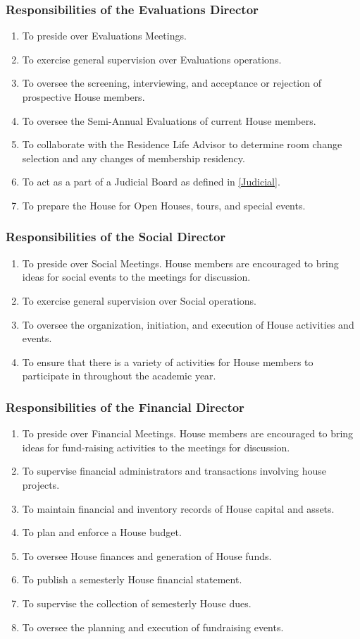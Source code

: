\documentclass{article}
\newcommand{\asubsection}[1]{\subsubsection{#1} \label{#1}}
\begin{document}
\asubsection{Responsibilities of the Evaluations Director}
\begin{enumerate}
	\item To preside over Evaluations Meetings.
	\item To exercise general supervision over Evaluations operations.
	\item To oversee the screening, interviewing, and acceptance or rejection of prospective House members.
	\item To oversee the Semi-Annual Evaluations of current House members.
	\item To collaborate with the Residence Life Advisor to determine room change selection and any changes of membership residency.
	\item To act as a part of a Judicial Board as defined in \ref{Judicial}.
	\item To prepare the House for Open Houses, tours, and special events.
\end{enumerate}

\asubsection{Responsibilities of the Social Director}
\begin{enumerate}
	\item To preside over Social Meetings. House members are encouraged to bring ideas for social events to the meetings for discussion.
	\item To exercise general supervision over Social operations.
	\item To oversee the organization, initiation, and execution of House activities and events.
	\item To ensure that there is a variety of activities for House members to participate in throughout the academic year.
\end{enumerate}

\asubsection{Responsibilities of the Financial Director}
\begin{enumerate}
	\item To preside over Financial Meetings. House members are encouraged to bring ideas for fund-raising activities to the meetings for discussion.
	\item To supervise financial administrators and transactions involving house projects.
	\item To maintain financial and inventory records of House capital and assets.
	\item To plan and enforce a House budget.
	\item To oversee House finances and generation of House funds.
	\item To publish a semesterly House financial statement.
	\item To supervise the collection of semesterly House dues.
	\item To oversee the planning and execution of fundraising events.
\end{enumerate}
\end{document}
